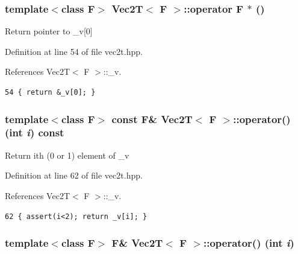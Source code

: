 \subsubsection{\setlength{\rightskip}{0pt plus 5cm}template$<$class F$>$ {\bf Vec2T}$<$ F $>$::operator F $\ast$ ()\hspace{0.3cm}{\tt  [inline]}}\label{classVec2T_ac352e6903287f8c15cc49407e292610_ac352e6903287f8c15cc49407e292610}


Return pointer to \_\-v[0] 

Definition at line 54 of file vec2t.hpp.

References Vec2T$<$ F $>$::\_\-v.

\footnotesize\begin{verbatim}54 { return &_v[0]; }
\end{verbatim}\normalsize 


\subsubsection{\setlength{\rightskip}{0pt plus 5cm}template$<$class F$>$ const F\& {\bf Vec2T}$<$ F $>$::operator() (int {\em i}) const\hspace{0.3cm}{\tt  [inline]}}\label{classVec2T_46442ed0ae535217a90cc5b4b63a1f44_46442ed0ae535217a90cc5b4b63a1f44}


Return ith (0 or 1) element of \_\-v 

Definition at line 62 of file vec2t.hpp.

References Vec2T$<$ F $>$::\_\-v.

\footnotesize\begin{verbatim}62 { assert(i<2); return _v[i]; }
\end{verbatim}\normalsize 


\subsubsection{\setlength{\rightskip}{0pt plus 5cm}template$<$class F$>$ F\& {\bf Vec2T}$<$ F $>$::operator() (int {\em i})\hspace{0.3cm}{\tt  [inline]}}\label{classVec2T_a6859783df5149b240b538ed4f692366_a6859783df5149b240b538ed4f692366}


